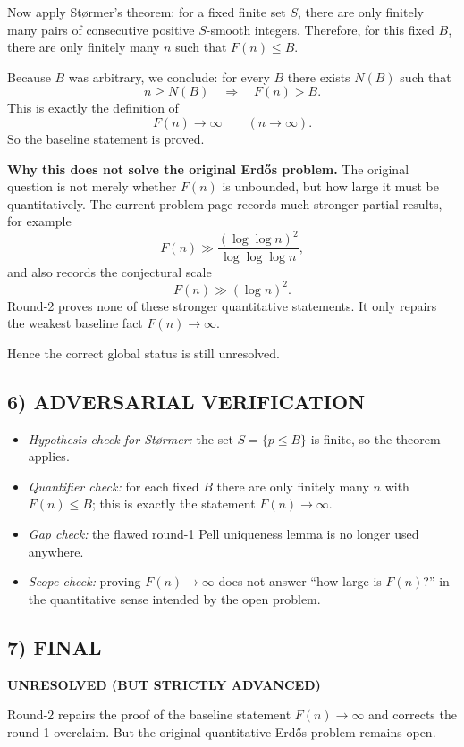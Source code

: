 Now apply St\o rmer's theorem: for a fixed finite set $S$, there are only finitely many pairs of consecutive positive $S$-smooth integers. Therefore, for this fixed $B$, there are only finitely many $n$ such that $F(n)\le B$.

Because $B$ was arbitrary, we conclude:
for every $B$ there exists $N(B)$ such that
\[
n\ge N(B)\quad\Longrightarrow\quad F(n)>B.
\]
This is exactly the definition of
\[
F(n)\to\infty\qquad (n\to\infty).
\]
So the baseline statement is proved.

\medskip
\textbf{Why this does not solve the original Erd\H{o}s problem.}
The original question is not merely whether $F(n)$ is unbounded, but how large it must be quantitatively. The current problem page records much stronger partial results, for example
\[
F(n)\gg \frac{(\log\log n)^2}{\log\log\log n},
\]
and also records the conjectural scale
\[
F(n)\gg (\log n)^2.
\]
Round-2 proves none of these stronger quantitative statements. It only repairs the weakest baseline fact $F(n)\to\infty$.

Hence the correct global status is still unresolved.

\subsection*{6) ADVERSARIAL VERIFICATION}
\begin{itemize}
\item \emph{Hypothesis check for St\o rmer:} the set $S=\{p\le B\}$ is finite, so the theorem applies.
\item \emph{Quantifier check:} for each fixed $B$ there are only finitely many $n$ with $F(n)\le B$; this is exactly the statement $F(n)\to\infty$.
\item \emph{Gap check:} the flawed round-1 Pell uniqueness lemma is no longer used anywhere.
\item \emph{Scope check:} proving $F(n)\to\infty$ does not answer ``how large is $F(n)$?'' in the quantitative sense intended by the open problem.
\end{itemize}

\subsection*{7) FINAL}
\textbf{UNRESOLVED (BUT STRICTLY ADVANCED)}

Round-2 repairs the proof of the baseline statement $F(n)\to\infty$ and corrects the round-1 overclaim. But the original quantitative Erd\H{o}s problem remains open.


